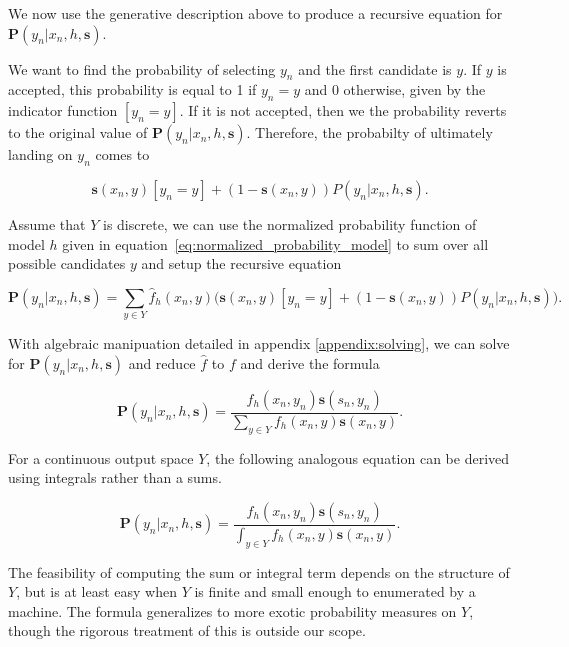 \documentclass[twoside]{article}
\begin{document}
We now use the generative description above to produce a recursive equation for \(\mathbf{P}(y_n|x_n,h,\mathbf{s})\).

We want to find the probability of selecting \(y_n\) and the first candidate is \(y\). If \(y\) is accepted, this probability is equal to 1 if \(y_n = y\) and 0 otherwise, given by the indicator function \(\left [y_n = y\right ]\). If it is not accepted, then we the probability reverts to the original value of \(\mathbf{P}(y_n|x_n,h,\mathbf{s})\). Therefore, the probabilty of ultimately landing on \(y_n\) comes to

\[\mathbf{s}(x_n,y)\left [y_n = y\right ] + (1-\mathbf{s}(x_n,y))P(y_n|x_n,h,\mathbf{s}).\]

Assume that \(Y\) is discrete, we can use the normalized probability function of model \(h\) given in equation~\eqref{eq:normalized_probability_model} to sum over all possible candidates \(y\) and setup the recursive equation

\begin{equation}
\label{eq:bias_corrected_setup}
\mathbf{P}(y_n|x_n,h,\mathbf{s})=\sum_{y \in Y}\hat{f}_h(x_n,y)\big(\mathbf{s}(x_n,y)\left [y_n = y\right ] + (1-\mathbf{s}(x_n,y))P(y_n|x_n,h,\mathbf{s})\big).
\end{equation}

With algebraic manipuation detailed in appendix \ref{appendix:solving}, we can solve for \(\mathbf{P}(y_n|x_n,h,\mathbf{s})\) and reduce \(\hat{f}\) to \(f\) and derive the formula

\begin{equation}
\label{eq:bias_corrected_prob}
\mathbf{P}(y_n|x_n,h,\mathbf{s})=\frac{f_h(x_n,y_n)\mathbf{s}(s_n,y_n)}{\sum_{y \in Y}f_h(x_n,y)\mathbf{s}(x_n,y)}.
\end{equation}

For a continuous output space \(Y\), the following analogous equation can be derived using integrals rather than a sums.

\begin{equation}
\label{eq:bias_corrected_prob_continuous}
\mathbf{P}(y_n|x_n,h,\mathbf{s})=\frac{f_h(x_n,y_n)\mathbf{s}(s_n,y_n)}{\int_{y \in Y}f_h(x_n,y)\mathbf{s}(x_n,y)}.
\end{equation}

The feasibility of computing the sum or integral term depends on the structure of \(Y\), but is at least easy when \(Y\) is finite and small enough to enumerated by a machine. The formula generalizes to more exotic probability measures on \(Y\), though the rigorous treatment of this is outside our scope.
\end{document}
